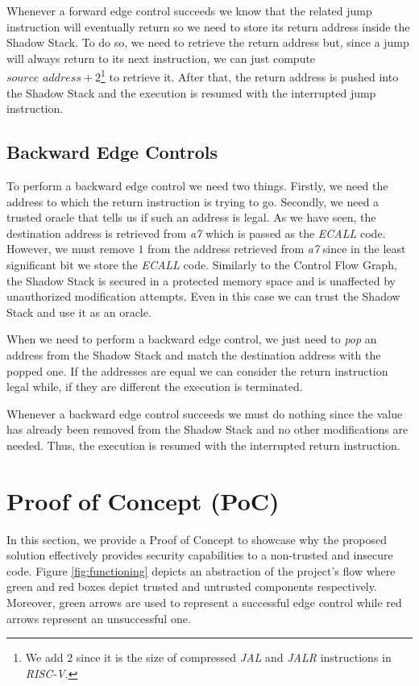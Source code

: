 Whenever a forward edge control succeeds we know that the related jump instruction
will eventually return so we need to store its return address inside the Shadow Stack.
To do so, we need to retrieve the return address but, since a jump will always
return to its next instruction, we can just compute $\textit{source address}+ 2$\footnote{We
add $2$ since it is the size of compressed \textit{JAL} and \textit{JALR}
instructions in \textit{RISC-V}.} to retrieve it. After that, the return address
is pushed into the Shadow Stack and the execution is resumed with the
interrupted jump instruction.

\subsection{Backward Edge Controls}
\label{subsec:backward}

To perform a backward edge control we need two things. Firstly, we need the address
to which the return instruction is trying to go. Secondly, we need a trusted oracle
that tells us if such an address is legal. As we have seen, the destination address
is retrieved from \textit{a7} which is passed as the \textit{ECALL} code.
However, we must remove $1$ from the address retrieved from \textit{a7} since in
the least significant bit we store the \textit{ECALL} code. Similarly to the
Control Flow Graph, the Shadow Stack is secured in a protected memory space and is
unaffected by unauthorized modification attempts. Even in this case we can trust
the Shadow Stack and use it as an oracle.

When we need to perform a backward edge control, we just need to \textit{pop} an
address from the Shadow Stack and match the destination address with the popped
one. If the addresses are equal we can consider the return instruction legal while,
if they are different the execution is terminated.

Whenever a backward edge control succeeds we must do nothing since the value has
already been removed from the Shadow Stack and no other modifications are needed.
Thus, the execution is resumed with the interrupted return instruction.

\section{Proof of Concept (PoC)}
\label{sec:project_poc}

In this section, we provide a Proof of Concept to showcase why the proposed
solution effectively provides security capabilities to a non-trusted and
insecure code. Figure \ref{fig:functioning} depicts an abstraction of the project's
flow where green and red boxes depict trusted and untrusted components respectively.
Moreover, green arrows are used to represent a successful edge control while red
arrows represent an unsuccessful one.

